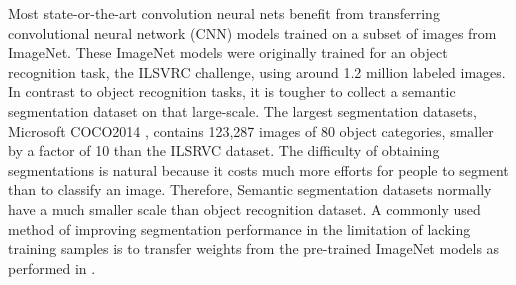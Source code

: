 
Most state-or-the-art convolution neural nets \cite{long2015fully,chen2016deeplab,he2017mask} benefit from transferring convolutional neural network (CNN) models trained on a subset of images from ImageNet.
These ImageNet models \cite{krizhevsky2012imagenet,simonyan2014very,szegedy2015going,he2016deep} were originally trained for an object recognition task, the ILSVRC \cite{russakovsky2015imagenet} challenge, using around 1.2 million labeled images.
In contrast to object recognition tasks, it is tougher to collect a  semantic segmentation dataset on that large-scale.
The largest segmentation datasets, Microsoft COCO2014 \cite{lin2014microsoft}, contains 123,287 images of 80 object categories, smaller by a factor of 10 than the ILSRVC dataset.
The difficulty of obtaining segmentations is natural because it costs much more efforts for people to segment than to classify an image.
Therefore, Semantic segmentation datasets normally have a much smaller scale than object recognition dataset.
A commonly used method of improving segmentation performance in the limitation of lacking training samples is to transfer weights from the pre-trained ImageNet models as performed in  \cite{long2015fully,chen2016deeplab}.



